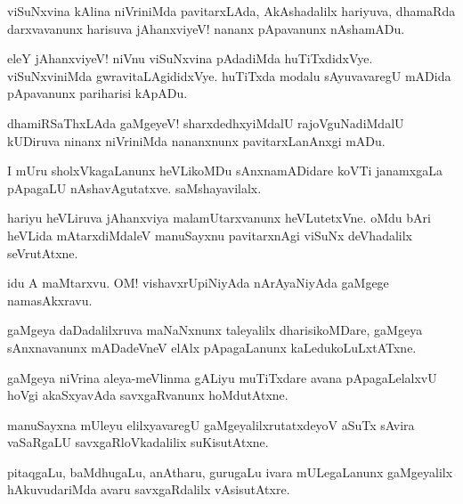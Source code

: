 \documentclass{article}
\begin{document}
\begin{mng}%
viSuNxvina kAlina niVriniMda pavitarxLAda, AkAshadalilx hariyuva, dhamaRda darxvavanunx harisuva jAhanxviyeV! nananx pApavanunx nAshamADu.
\end{mng}

\begin{mng}%
eleY jAhanxviyeV! niVnu viSuNxvina pAdadiMda huTiTxdidxVye. viSuNxviniMda gwravitaLAgididxVye. huTiTxda modalu sAyuvavaregU mADida pApavanunx pariharisi kApADu.
\end{mng}

\begin{mng}%
dhamiRSaThxLAda gaMgeyeV! sharxdedhxyiMdalU rajoVguNadiMdalU kUDiruva ninanx niVriniMda nananxnunx pavitarxLanAnxgi mADu.
\end{mng}

\begin{mng}%
I mUru sholxVkagaLanunx heVLikoMDu sAnxnamADidare koVTi janamxgaLa pApagaLU nAshavAgutatxve. saMshayavilalx.
\end{mng}

\begin{mng}%
hariyu heVLiruva jAhanxviya malamUtarxvanunx heVLutetxVne. oMdu bAri heVLida mAtarxdiMdaleV manuSayxnu pavitarxnAgi viSuNx deVhadalilx seVrutAtxne.
\end{mng}

\begin{mng}%
idu A maMtarxvu. OM! vishavxrUpiNiyAda nArAyaNiyAda gaMgege namasAkxravu.
\end{mng}

\begin{mng}%
gaMgeya daDadalilxruva maNaNxnunx taleyalilx dharisikoMDare, gaMgeya sAnxnavanunx mADadeVneV elAlx pApagaLanunx kaLedukoLuLxtATxne.
\end{mng}

\begin{mng}%
gaMgeya niVrina aleya-meVlinma gALiyu muTiTxdare avana pApagaLelalxvU hoVgi akaSxyavAda savxgaRvanunx hoMdutAtxne.
\end{mng}

\begin{mng}%
manuSayxna mUleyu elilxyavaregU gaMgeyalilxrutatxdeyoV aSuTx sAvira vaSaRgaLU savxgaRloVkadalilix suKisutAtxne.
\end{mng}

\begin{mng}%
pitaqgaLu, baMdhugaLu, anAtharu, gurugaLu ivara mULegaLanunx gaMgeyalilx hAkuvudariMda avaru savxgaRdalilx vAsisutAtxre.
\end{mng}
\end{document}
